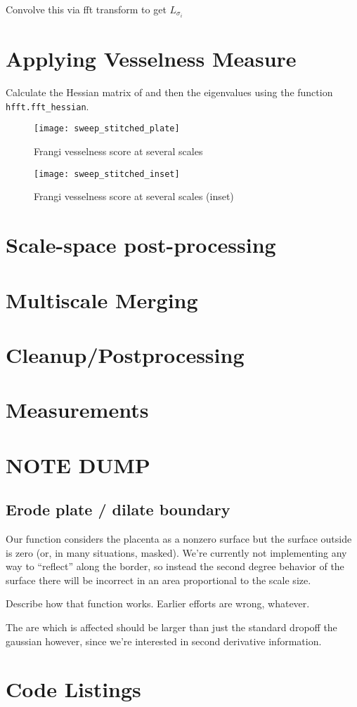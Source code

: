 	Convolve this via fft transform to get $L_{\sigma_i}$
	

\section{Applying Vesselness Measure}
Calculate the Hessian matrix of  and then the eigenvalues using the function \texttt{hfft.fft\_hessian}.


\begin{figure}
	\texttt{[image: sweep\_stitched\_plate]}
	\caption{Frangi vesselness score at several scales}
\end{figure}
\begin{figure}
	\texttt{[image: sweep\_stitched\_inset]}
	\caption{Frangi vesselness score at several scales (inset)}
\end{figure}
\section{Scale-space post-processing}
\section{Multiscale Merging}
\section{Cleanup/Postprocessing}
\section{Measurements}

\section{NOTE DUMP}
	
	\subsection{Erode plate / dilate boundary}
	
	Our function considers the placenta as a nonzero surface but the surface outside is zero (or, in many situations, masked). We're currently not implementing any way to ``reflect'' along the border, so instead the second degree behavior of the surface there will be incorrect in an area proportional to the scale size.
	
	Describe how that function works. Earlier efforts are wrong, whatever.
	
	The are which is affected should be larger than just the standard dropoff the gaussian however, since we're interested
	in second derivative information.
	
\section{Code Listings}
